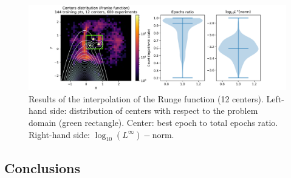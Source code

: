 \documentclass[12pt]{report} %
\begin{document}
\begin{figure}[H]
  \includegraphics[width=\textwidth, trim={2cm 0 2.8cm 0}, clip=true]{imagenes/experiments/2d/franke_interpolation/tr12_c12_franke.pdf}
  \caption{Results of the interpolation of the Runge function (12 centers). 
  Left-hand side: distribution of centers with respect to the problem domain (green rectangle). Center: best epoch to total epochs ratio.
  Right-hand side: $\log_{10}(L^\infty)-$norm.}
  \label{fig:franke-tr12-c12}
\end{figure}

\subsection*{Conclusions}
\end{document}
